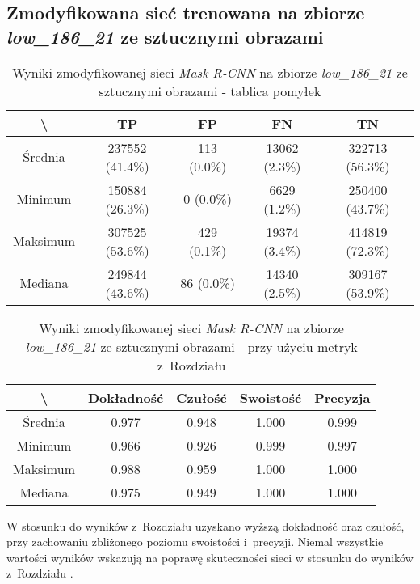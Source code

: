\subsection{Zmodyfikowana sieć trenowana na zbiorze \textit{low\_186\_21} ze sztucznymi obrazami}
\label{sec:results_low_modified_generated}

\begin{table}[H]
	\centering
	\caption{Wyniki zmodyfikowanej sieci \textit{Mask R-CNN} na zbiorze \textit{low\_186\_21} ze sztucznymi obrazami - tablica pomyłek}
	\vspace{6pt}
	{\footnotesize
		\begin{tabular}{|c|c|c|c|c|}
      \hline \textbackslash & TP & FP & FN & TN \\
      \hline Średnia & 237552 (41.4\%) & 113 (0.0\%) & 13062 (2.3\%) & 322713 (56.3\%) \\
      \hline Minimum & 150884 (26.3\%) & 0 (0.0\%) & 6629 (1.2\%) & 250400 (43.7\%) \\
      \hline Maksimum & 307525 (53.6\%) & 429 (0.1\%) & 19374 (3.4\%) & 414819 (72.3\%) \\
      \hline Mediana & 249844 (43.6\%) & 86 (0.0\%) & 14340 (2.5\%) & 309167 (53.9\%) \\
      \hline
		\end{tabular}
	}
  \vspace{0pt}
  \label{Tab:low_modified_generated}
\end{table}


\begin{table}[H]
	\centering
	\caption{Wyniki zmodyfikowanej sieci \textit{Mask R-CNN} na zbiorze \textit{low\_186\_21} ze sztucznymi obrazami - przy użyciu metryk z~Rozdziału }
	\vspace{6pt}
	{\footnotesize
		\begin{tabular}{|c|c|c|c|c|}
      \hline \textbackslash & Dokładność & Czułość & Swoistość & Precyzja \\
      \hline Średnia & 0.977 & 0.948 & 1.000 & 0.999 \\
      \hline Minimum & 0.966 & 0.926 & 0.999 & 0.997 \\
      \hline Maksimum & 0.988 & 0.959 & 1.000 & 1.000 \\
      \hline Mediana & 0.975 & 0.949 & 1.000 & 1.000 \\
      \hline
		\end{tabular}
	}
  \vspace{0pt}
  \label{Tab:low_modified_generated_calculated}
\end{table}

W stosunku do wyników z~Rozdziału  uzyskano wyższą dokładność oraz czułość, przy zachowaniu zbliżonego poziomu swoistości i~precyzji.
Niemal wszystkie wartości wyników wskazują na poprawę skuteczności sieci w stosunku do wyników z~Rozdziału .
